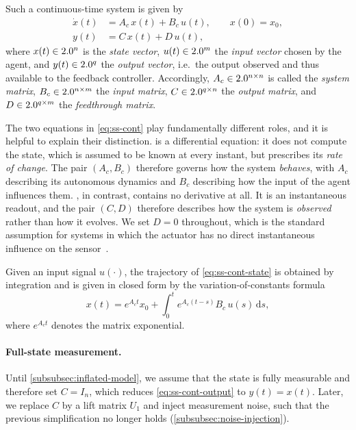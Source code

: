 Such a continuous-time system is given by
\begin{subequations}
\label{eq:ss-cont}
\begin{align}
    \dot{x}(t) &= A_c\, x(t) + B_c\, u(t), \qquad x(0) = x_0, \label{eq:ss-cont-state}\\
    y(t)       &= C\, x(t) + D\, u(t), \label{eq:ss-cont-output}
\end{align}
\end{subequations}
where $x(t) \in 2.0^{n}$ is the \emph{state vector}, $u(t) \in 2.0^{m}$ the
\emph{input vector} chosen by the agent, and $y(t) \in 2.0^{q}$ the
\emph{output vector}, i.e.\ the output observed and thus available to the
feedback controller. Accordingly, $A_c \in 2.0^{n \times n}$ is called the
\emph{system matrix}, $B_c \in 2.0^{n \times m}$ the \emph{input matrix},
$C \in 2.0^{q \times n}$ the \emph{output matrix}, and $D \in 2.0^{q \times m}$
the \emph{feedthrough matrix}.
 
The two equations in \eqref{eq:ss-cont} play fundamentally different roles, and
it is helpful to explain their distinction.
 is a differential equation: it does not compute the
state, which is assumed to be known at every instant, but prescribes its
\emph{rate of change}. The pair $(A_c, B_c)$ therefore governs how the system
\emph{behaves}, with $A_c$ describing its autonomous dynamics and
$B_c$ describing how the input of the agent influences them. , in contrast, 
contains no derivative at all. It is an instantaneous readout, and the pair $(C, D)$ therefore
describes how the system is \emph{observed} rather than how it evolves. We set
$D = 0$ throughout, which is the standard assumption for systems in which the
actuator has no direct instantaneous influence on the sensor~\cite[p.~4]{Werner2021Control}.
 
Given an input signal $u(\cdot)$, the trajectory of \eqref{eq:ss-cont-state} is
obtained by integration and is given in closed form by the variation-of-constants
formula~\cite[p.~13, Eq.~(2.20)]{Werner2021Control}
\begin{equation}
    \label{eq:variation-of-constants}
    x(t) = e^{A_c t} x_0 + \int_{0}^{t} e^{A_c (t - s)} B_c\, u(s)\, \mathrm{d}s ,
\end{equation}
where $e^{A_c t}$ denotes the matrix exponential.
 
\paragraph{Full-state measurement.}
Until \cref{subsubsec:inflated-model}, we assume that the state is fully
measurable and therefore set $C = I_n$, which reduces
\eqref{eq:ss-cont-output} to $y(t) = x(t)$. Later,
we replace $C$ by a lift matrix $U_1$ and
inject measurement noise, such that the previous simplification
no longer holds (\cref{subsubsec:noise-injection}).
 
